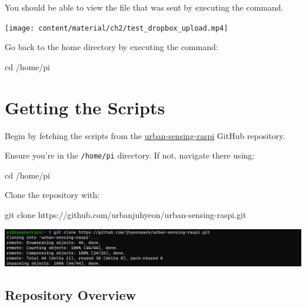 \documentclass[
  letterpaper,
]{scrbook}
\newenvironment{Shaded}{\begin{snugshade}}{\end{snugshade}}
\newcommand{\BuiltInTok}[1]{\textcolor[rgb]{0.00,0.23,0.31}{#1}}
\newcommand{\FunctionTok}[1]{\textcolor[rgb]{0.28,0.35,0.67}{#1}}
\newcommand{\NormalTok}[1]{\textcolor[rgb]{0.00,0.23,0.31}{#1}}
\begin{document}
You should be able to view the file that was sent by executing the
command.

\texttt{[image: content/material/ch2/test\_dropbox\_upload.mp4]}

Go back to the home directory by executing the command:

\begin{Shaded}
\begin{Highlighting}[]
\BuiltInTok{cd}\NormalTok{ /home/pi}
\end{Highlighting}
\end{Shaded}

\hypertarget{getting-the-scripts}{%
\section{Getting the Scripts}\label{getting-the-scripts}}

Begin by fetching the scripts from the
\href{https://github.com/urbanjuhyeon/urban-sensing-raspi}{urban-sensing-raspi}
GitHub repository.

Ensure you're in the \texttt{/home/pi} directory. If not, navigate there
using:

\begin{Shaded}
\begin{Highlighting}[]
\BuiltInTok{cd}\NormalTok{ /home/pi}
\end{Highlighting}
\end{Shaded}

Clone the repository with:

\begin{Shaded}
\begin{Highlighting}[]
\FunctionTok{git}\NormalTok{ clone https://github.com/urbanjuhyeon/urban{-}sensing{-}raspi.git}
\end{Highlighting}
\end{Shaded}

\includegraphics{content/material/ch2/clone_raspi.png}

\hypertarget{repository-overview}{%
\subsection*{Repository Overview}\label{repository-overview}}
\end{document}
